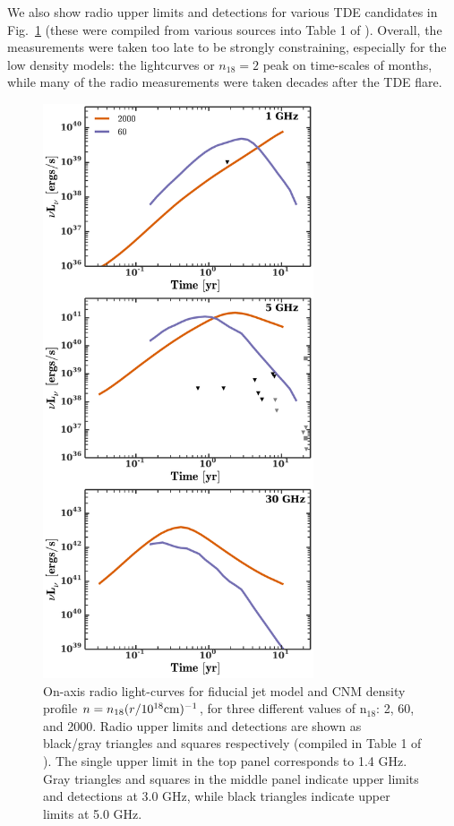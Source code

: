 \documentclass[usenatbib,fleqn]{mnras}
\begin{document}
We also show radio upper limits and detections for various TDE
candidates in Fig.~\ref{fig:upper_limits} (these were compiled from
various sources into Table 1 of \citealt{Mimica+2015}). Overall, the
measurements were taken too late to be strongly constraining,
especially for the low density models: the lightcurves or $n_{18}=2$
peak on time-scales of months, while many of the radio measurements
were taken decades after the TDE flare.

\begin{figure} 
  \includegraphics[width=8cm]{lightcurves.pdf}
  \caption{\label{fig:upper_limits} On-axis radio light-curves for
    fiducial jet model and CNM density profile $n=n_{18} (r/10^{18}
    {\rm cm})^{-1}$, for three different values of n$_{18}$: 2, 60,
    and 2000. Radio upper limits and detections are shown as
    black/gray triangles and squares respectively (compiled in Table 1
    of \citealt{Mimica+2015}). The single upper limit in the top panel
    corresponds to 1.4 GHz. Gray triangles and squares in the middle
    panel indicate upper limits and detections at 3.0 GHz, while black
    triangles indicate upper limits at 5.0 GHz.}
\end{figure}
\end{document}
